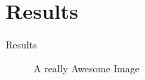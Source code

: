 \chapter{Results}
\label{chapter:results}
Results



\begin{figure}[hp]
\centering
{}
  \caption{\newline A really Awesome Image}\label{fig:a}
\endminipage\hfill
{}

\end{figure}
